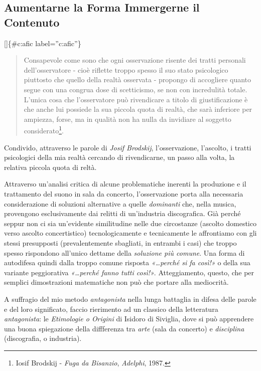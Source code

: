 \documentclass[a4paper,11pt]{article}
\begin{document}
\subsection{Aumentarne la Forma Immergerne il Contenuto}\hypertarget{aumentarne-la-forma-immergerne-il-contenuto}{}\label{aumentarne-la-forma-immergerne-il-contenuto}

{[}{]}\{\#c:afic label=''c:afic''\}

\begin{quote}
Consapevole come sono che ogni osservazione risente dei tratti
personali dell'osservatore - cioè riflette troppo spesso il suo stato
psicologico piuttosto che quello della realtà osservata - propongo di
accogliere quanto segue con una congrua dose di scetticismo, se non
con incredulità totale. L'unica cosa che l'osservatore può rivendicare
a titolo di giustificazione è che anche lui possiede la sua piccola
quota di realtà, che sarà inferiore per ampiezza, forse, ma in qualità
non ha nulla da invidiare al soggetto considerato\footnote{Iosif Brodskij - \emph{Fuga da Bisanzio}, \emph{Adelphi}, 1987.}.
\end{quote}

Condivido, attraverso le parole di \emph{Josif Brodskij}, l'osservazione,
l'ascolto, i tratti psicologici della mia realtà cercando di
rivendicarne, un passo alla volta, la relativa piccola quota di reltà.

Attraverso un'analisi critica di alcune problematiche inerenti la
produzione e il trattamento del suono in sala da concerto,
l'osservazione porta alla necessaria considerazione di soluzioni
alternative a quelle \emph{dominanti} che, nella musica, provengono
esclusivamente dai relitti di un'industria discografica. Già perché
seppur non ci sia un'evidente similitudine nelle due circostanze
(ascolto domestico verso ascolto concertistico) tecnologicamente e
tecnicamente le affrontiamo con gli stessi presupposti (prevalentemente
sbagliati, in entrambi i casi) che troppo spesso rispondono all'unico
dettame della \emph{soluzione più comune}. Una forma di autodifesa quindi
dalla troppo comune risposta \emph{«\ldots{}perché si fa così!»} o della sua
variante peggiorativa \emph{«\ldots{}perché fanno tutti così!»}. Atteggiamento,
questo, che per semplici dimostrazioni matematiche non può che portare
alla mediocrità.

A suffragio del mio metodo \emph{antagonista} nella lunga battaglia in difesa
delle parole e del loro significato, faccio rierimento ad un classico
della letteratura \emph{antagonista}: le \emph{Etimologie o Origini} di Isidoro di
Siviglia, dove si può apprendere una buona spiegazione della diffferenza
tra \emph{arte} (sala da concerto) e \emph{disciplina} (discografia, o industria).
\end{document}
